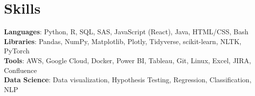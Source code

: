 \section{Skills}
 \begin{itemize}[leftmargin=0.15in, label={}]
    \small{\item{
     \textbf{Languages}{: Python, R, SQL, SAS, JavaScript (React), Java, HTML/CSS, Bash} \\
     \textbf{Libraries}{: Pandas, NumPy, Matplotlib, Plotly, Tidyverse, scikit-learn, NLTK, PyTorch}\\
     \textbf{Tools}{: AWS, Google Cloud, Docker, Power BI, Tableau, Git, Linux, Excel, JIRA, Confluence}\\
     \textbf{Data Science}{: Data visualization, Hypothesis Testing, Regression, Classification, NLP}\\
    }}
 \end{itemize}